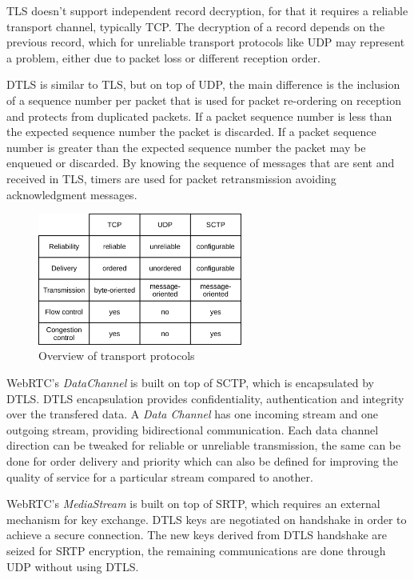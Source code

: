 \ac{TLS} doesn't support independent record decryption, for that it requires a reliable transport channel, typically \ac{TCP}. The decryption of a record depends on the previous record, which for unreliable transport protocols like \ac{UDP} may represent a problem, either due to packet loss or different reception order.

\ac{DTLS} is similar to \ac{TLS}, but on top of \ac{UDP}, the main difference is the inclusion of a sequence number per packet that is used for packet re-ordering on reception and protects from duplicated packets. If a packet sequence number is less than the expected sequence number the packet is discarded. If a packet sequence number is greater than the expected sequence number the packet may be enqueued or discarded. By knowing the sequence of messages that are sent and received in \ac{TLS}, timers are used for packet retransmission avoiding acknowledgment messages.

\begin{figure}[H]
	\centering
	\includegraphics[width=0.6\textwidth]{figures/basic_protocols.png}
	\caption{Overview of transport protocols}
\end{figure}

\ac{WebRTC}'s \emph{DataChannel} is built on top of \ac{SCTP}, which is encapsulated by \ac{DTLS}. \ac{DTLS} encapsulation provides confidentiality, authentication and integrity over the transfered data. A \emph{Data Channel} has one incoming stream and one outgoing stream, providing bidirectional communication. Each data channel direction can be tweaked for reliable or unreliable transmission, the same can be done for order delivery and priority which can also be defined for improving the quality of service for a particular stream compared to another.

\ac{WebRTC}'s \emph{MediaStream} is built on top of \ac{SRTP}, which requires an external mechanism for key exchange. \ac{DTLS} keys are negotiated on handshake in order to achieve a secure connection. The new keys derived from \ac{DTLS} handshake are seized for \ac{SRTP} encryption, the remaining communications are done through \ac{UDP} without using \ac{DTLS}.

